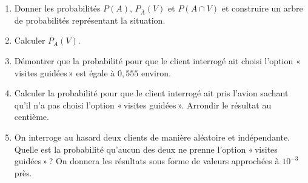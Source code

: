 \documentclass[a4paper,11pt,exos]{nsi} %
\begin{document}
\begin{enumerate}
    \item Donner les probabilités $P(A)$, $P_{\bar{A}}(V)$ et $P(A \cap V)$ et construire un arbre de probabilités représentant la situation.
    \item Calculer $P_A(V)$.
    \item Démontrer que la probabilité pour que le client interrogé ait choisi l'option  «\,visites guidées\,»  est égale à $0{,}555$ environ.
    \item Calculer la probabilité pour que le client interrogé ait pris l'avion sachant qu'il n'a pas choisi l'option  «\,visites guidées\,». Arrondir le résultat au centième.
    \item On interroge au hasard deux clients de manière aléatoire et indépendante.\\ Quelle est la probabilité qu'aucun des deux ne prenne l'option  «\,visites guidées\,»\,? On donnera les résultats sous forme de valeurs approchées à $10^{-3}$ près.
\end{enumerate}
\end{document}
